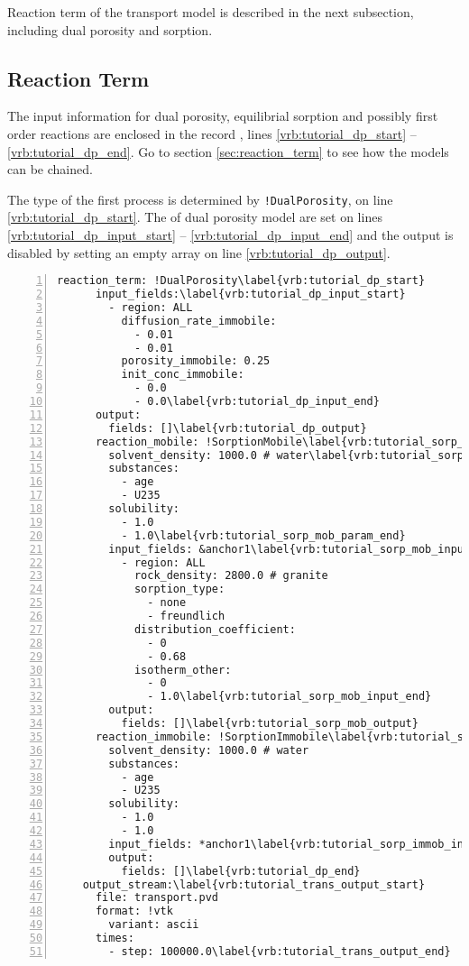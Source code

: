 Reaction term of the transport model is described in the next subsection, including dual porosity and sorption.

\subsection{Reaction Term}\label{subsubsec:reactions}
The input information for dual porosity, equilibrial sorption and possibly first order reactions are enclosed in the record 
, lines \ref{vrb:tutorial_dp_start} -- \ref{vrb:tutorial_dp_end}. Go to section \ref{sec:reaction_term}
to see how the models can be chained.

The type of the first process is determined by {\tt !DualPorosity}, on line \ref{vrb:tutorial_dp_start}. 
The 
of dual porosity model are set on lines \ref{vrb:tutorial_dp_input_start} -- \ref{vrb:tutorial_dp_input_end} and the output is disabled by setting an empty array on line \ref{vrb:tutorial_dp_output}.

\begin{Verbatim}[numbers=left, firstnumber=last,commandchars=\\\{\}]
    reaction_term: !DualPorosity\label{vrb:tutorial_dp_start}
      input_fields:\label{vrb:tutorial_dp_input_start}
        - region: ALL
          diffusion_rate_immobile:
            - 0.01
            - 0.01
          porosity_immobile: 0.25
          init_conc_immobile:
            - 0.0
            - 0.0\label{vrb:tutorial_dp_input_end}
      output:
        fields: []\label{vrb:tutorial_dp_output}
      reaction_mobile: !SorptionMobile\label{vrb:tutorial_sorp_mob}
        solvent_density: 1000.0 # water\label{vrb:tutorial_sorp_mob_param_start}
        substances:
          - age
          - U235
        solubility:
          - 1.0
          - 1.0\label{vrb:tutorial_sorp_mob_param_end}
        input_fields: &anchor1\label{vrb:tutorial_sorp_mob_input_start}
          - region: ALL
            rock_density: 2800.0 # granite
            sorption_type:
              - none
              - freundlich
            distribution_coefficient:
              - 0
              - 0.68
            isotherm_other:
              - 0
              - 1.0\label{vrb:tutorial_sorp_mob_input_end}
        output:
          fields: []\label{vrb:tutorial_sorp_mob_output}
      reaction_immobile: !SorptionImmobile\label{vrb:tutorial_sorp_immob}
        solvent_density: 1000.0 # water
        substances:
          - age
          - U235
        solubility:
          - 1.0
          - 1.0
        input_fields: *anchor1\label{vrb:tutorial_sorp_immob_input}
        output:
          fields: []\label{vrb:tutorial_dp_end}
    output_stream:\label{vrb:tutorial_trans_output_start}
      file: transport.pvd
      format: !vtk
        variant: ascii
      times:
        - step: 100000.0\label{vrb:tutorial_trans_output_end}
\end{Verbatim}


